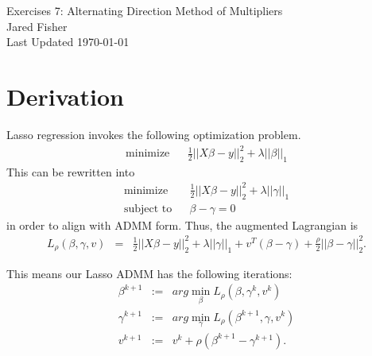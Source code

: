 \documentclass{article}
\begin{document}
\large 
\begin{center}
Exercises 7: Alternating Direction Method of Multipliers\\
\vspace{10pt}
Jared Fisher\\
Last Updated \today
\end{center}
\normalsize


\bigskip

\section{Derivation}
Lasso regression invokes the following optimization problem. 
\begin{eqnarray}
\text{minimize} && \frac{1}{2} ||X\beta - y||^2_2 + \lambda ||\beta||_1
\end{eqnarray}
This can be rewritten into
\begin{eqnarray*}
\text{minimize} && \frac{1}{2} ||X\beta - y||^2_2 + \lambda ||\gamma||_1\\
\text{subject to} && \beta - \gamma = 0
\end{eqnarray*}
in order to align with ADMM form. Thus, the augmented Lagrangian is 
\begin{eqnarray*}
L_\rho(\beta,\gamma,v) &=& \frac{1}{2} ||X\beta - y||^2_2 + \lambda ||\gamma||_1 + v^T( \beta - \gamma) + \frac{\rho}{2} || \beta - \gamma||^2_2.
\end{eqnarray*}

This means our Lasso ADMM has the following iterations:
\begin{eqnarray*}
\beta^{k+1} &:=& arg\min_{\beta} L_\rho(\beta,\gamma^k,v^k) \\
\gamma^{k+1} &:=& arg\min_{\gamma} L_\rho(\beta^{k+1},\gamma,v^k) \\
v^{k+1} &:=& v^k + \rho ( \beta^{k+1} - \gamma^{k+1}). \\
\end{eqnarray*}
\end{document}

